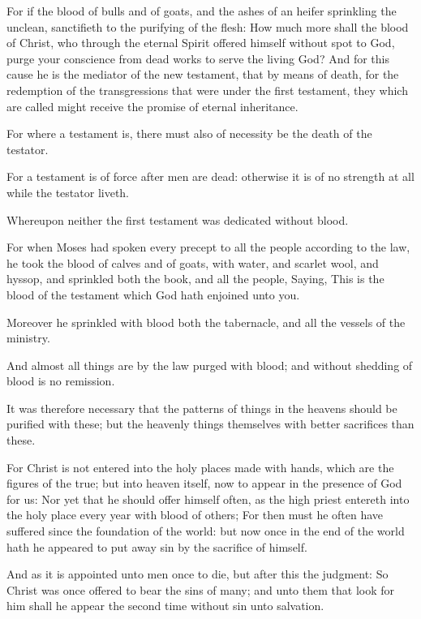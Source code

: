 \Verse For if the blood of bulls and of goats, and the ashes of an heifer sprinkling the unclean, sanctifieth to the purifying of the flesh: \Verse How much more shall the blood of Christ, who through the eternal Spirit offered himself without spot to God, purge your conscience from dead works to serve the living God?  \Verse And for this cause he is the mediator of the new testament, that by means of death, for the redemption of the transgressions that were under the first testament, they which are called might receive the promise of eternal inheritance.

\Verse For where a testament is, there must also of necessity be the death of the testator.

\Verse For a testament is of force after men are dead: otherwise it is of no strength at all while the testator liveth.

\Verse Whereupon neither the first testament was dedicated without blood.

\Verse For when Moses had spoken every precept to all the people according to the law, he took the blood of calves and of goats, with water, and scarlet wool, and hyssop, and sprinkled both the book, and all the people, \Verse Saying, This is the blood of the testament which God hath enjoined unto you.

\Verse Moreover he sprinkled with blood both the tabernacle, and all the vessels of the ministry.

\Verse And almost all things are by the law purged with blood; and without shedding of blood is no remission.

\Verse It was therefore necessary that the patterns of things in the heavens should be purified with these; but the heavenly things themselves with better sacrifices than these.

\Verse For Christ is not entered into the holy places made with hands, which are the figures of the true; but into heaven itself, now to appear in the presence of God for us: \Verse Nor yet that he should offer himself often, as the high priest entereth into the holy place every year with blood of others; \Verse For then must he often have suffered since the foundation of the world: but now once in the end of the world hath he appeared to put away sin by the sacrifice of himself.

\Verse And as it is appointed unto men once to die, but after this the judgment: \Verse So Christ was once offered to bear the sins of many; and unto them that look for him shall he appear the second time without sin unto salvation.



